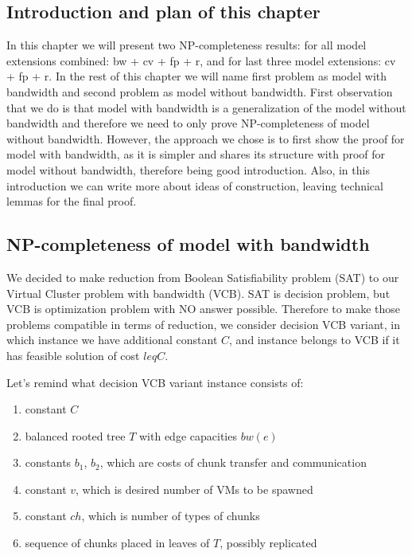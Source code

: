 \subsection{Introduction and plan of this chapter}

In this chapter we will present two NP-completeness results: for all
model extensions combined: bw + cv + fp + r, and for last three model
extensions: cv + fp + r. In the rest of this chapter we will name
first problem as model with bandwidth and second problem as model
without bandwidth. First observation that we do is that model with
bandwidth is a generalization of the model without bandwidth and
therefore we need to only prove NP-completeness of model without
bandwidth. However, the approach we chose is to first show the proof
for model with bandwidth, as it is simpler and shares its structure
with proof for model without bandwidth, therefore being good
introduction. Also, in this introduction we can write more about ideas
of construction, leaving technical lemmas for the final proof.

\subsection{NP-completeness of model with bandwidth}

We decided to make reduction from Boolean Satisfiability problem (SAT)
to our Virtual Cluster problem with bandwidth (VCB). SAT is decision
problem, but VCB is optimization problem with NO answer
possible. Therefore to make those problems compatible in terms of
reduction, we consider decision VCB variant, in which instance we have
additional constant $C$, and instance belongs to VCB if it has feasible
solution of cost $leq C$.

Let's remind what decision VCB variant instance consists of:
\begin{enumerate}
\item constant $C$
\item balanced rooted tree $T$ with edge capacities $bw(e)$
\item constants $b_1$, $b_2$, which are costs of chunk transfer and
communication
\item constant $v$, which is desired number of VMs to be spawned
\item constant $ch$, which is number of types of chunks
\item sequence of chunks placed in leaves of $T$, possibly replicated
\end{enumerate}

